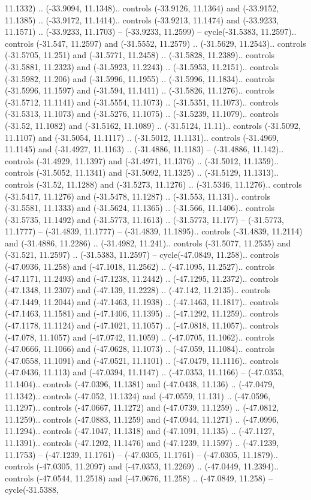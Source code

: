 \begin{scope}[shift={(2.5552, 9.9912)}]
\begin{scope}[shift={(48.1654, -14.8546)}]
11.1332) .. (-33.9094, 11.1348).. controls (-33.9126, 11.1364) and (-33.9152, 11.1385) .. (-33.9172, 11.1414).. controls (-33.9213, 11.1474) and (-33.9233, 11.1571) .. (-33.9233, 11.1703) -- (-33.9233, 11.2599) -- cycle(-31.5383, 11.2597).. controls (-31.547, 11.2597) and (-31.5552, 11.2579) .. (-31.5629, 11.2543).. controls (-31.5705, 11.251) and (-31.5771, 11.2458) .. (-31.5828, 11.2389).. controls (-31.5881, 11.2323) and (-31.5923, 11.2243) .. (-31.5953, 11.2151).. controls (-31.5982, 11.206) and (-31.5996, 11.1955) .. (-31.5996, 11.1834).. controls (-31.5996, 11.1597) and (-31.594, 11.1411) .. (-31.5826, 11.1276).. controls (-31.5712, 11.1141) and (-31.5554, 11.1073) .. (-31.5351, 11.1073).. controls (-31.5313, 11.1073) and (-31.5276, 11.1075) .. (-31.5239, 11.1079).. controls (-31.52, 11.1082) and (-31.5162, 11.1089) .. (-31.5124, 11.11).. controls (-31.5092, 11.1107) and (-31.5054, 11.1117) .. (-31.5012, 11.1131).. controls (-31.4969, 11.1145) and (-31.4927, 11.1163) .. (-31.4886, 11.1183) -- (-31.4886, 11.142).. controls (-31.4929, 11.1397) and (-31.4971, 11.1376) .. (-31.5012, 11.1359).. controls (-31.5052, 11.1341) and (-31.5092, 11.1325) .. (-31.5129, 11.1313).. controls (-31.52, 11.1288) and (-31.5273, 11.1276) .. (-31.5346, 11.1276).. controls (-31.5417, 11.1276) and (-31.5478, 11.1287) .. (-31.553, 11.131).. controls (-31.5581, 11.1333) and (-31.5624, 11.1365) .. (-31.566, 11.1406).. controls (-31.5735, 11.1492) and (-31.5773, 11.1613) .. (-31.5773, 11.177) -- (-31.5773, 11.1777) -- (-31.4839, 11.1777) -- (-31.4839, 11.1895).. controls (-31.4839, 11.2114) and (-31.4886, 11.2286) .. (-31.4982, 11.241).. controls (-31.5077, 11.2535) and (-31.521, 11.2597) .. (-31.5383, 11.2597) -- cycle(-47.0849, 11.258).. controls (-47.0936, 11.258) and (-47.1018, 11.2562) .. (-47.1095, 11.2527).. controls (-47.1171, 11.2493) and (-47.1238, 11.2442) .. (-47.1295, 11.2372).. controls (-47.1348, 11.2307) and (-47.139, 11.2228) .. (-47.142, 11.2135).. controls (-47.1449, 11.2044) and (-47.1463, 11.1938) .. (-47.1463, 11.1817).. controls (-47.1463, 11.1581) and (-47.1406, 11.1395) .. (-47.1292, 11.1259).. controls (-47.1178, 11.1124) and (-47.1021, 11.1057) .. (-47.0818, 11.1057).. controls (-47.078, 11.1057) and (-47.0742, 11.1059) .. (-47.0705, 11.1062).. controls (-47.0666, 11.1066) and (-47.0628, 11.1073) .. (-47.059, 11.1084).. controls (-47.0558, 11.1091) and (-47.0521, 11.1101) .. (-47.0479, 11.1116).. controls (-47.0436, 11.113) and (-47.0394, 11.1147) .. (-47.0353, 11.1166) -- (-47.0353, 11.1404).. controls (-47.0396, 11.1381) and (-47.0438, 11.136) .. (-47.0479, 11.1342).. controls (-47.052, 11.1324) and (-47.0559, 11.131) .. (-47.0596, 11.1297).. controls (-47.0667, 11.1272) and (-47.0739, 11.1259) .. (-47.0812, 11.1259).. controls (-47.0883, 11.1259) and (-47.0944, 11.1271) .. (-47.0996, 11.1294).. controls (-47.1047, 11.1318) and (-47.1091, 11.135) .. (-47.1127, 11.1391).. controls (-47.1202, 11.1476) and (-47.1239, 11.1597) .. (-47.1239, 11.1753) -- (-47.1239, 11.1761) -- (-47.0305, 11.1761) -- (-47.0305, 11.1879).. controls (-47.0305, 11.2097) and (-47.0353, 11.2269) .. (-47.0449, 11.2394).. controls (-47.0544, 11.2518) and (-47.0676, 11.258) .. (-47.0849, 11.258) -- cycle(-31.5388, 
\end{scope}
\end{scope}
